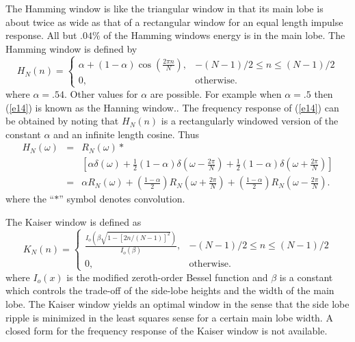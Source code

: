 	The Hamming window
 is like the triangular window
in that its main lobe is about twice as wide as that of
a rectangular window for an equal length impulse response.
All but $.04\%$ of the Hamming windows energy is in the
main lobe.  The Hamming window is defined by
%
\begin{equation}
H_N(n)=
        \left\{ \begin{array}{ll}
 \alpha+(1-\alpha)\cos(\frac{2\pi n}{N}), & \mbox{$-(N-1)/2\le n\le (N-1)/2$}\\
             0, & \mbox{otherwise}.
                \end{array}
       \right.
\label{e14}
\end{equation}
%
where $\alpha=.54$.  Other values for $\alpha$ are possible.
For example when $\alpha=.5$ then  (\ref{e14}) is known as the
Hanning window.. The frequency response of (\ref{e14})
can be obtained by noting that $H_N(n)$ is a
rectangularly windowed version of the constant $\alpha$ and an
infinite length cosine.  Thus
%
\begin{eqnarray}
H_N(\omega) &=&
R_N(\omega)*\\
&&[\alpha\delta(\omega)+\frac{1}{2}(1-\alpha)\delta(\omega
-\frac{2\pi}{N})+\frac{1}{2}(1-\alpha)\delta(\omega+\frac{2\pi}{N})]\\
&=& \alpha R_N(\omega)+(\frac{1-\alpha}{2})R_N(\omega+\frac{2\pi}{N})+
(\frac{1-\alpha}{2})R_N(\omega-\frac{2\pi}{N}).
\label{e15}
\end{eqnarray}
%
where the ``$*$'' symbol denotes convolution.

	The Kaiser window
 is defined as
%
\begin{equation}
K_N(n)=
        \left\{ \begin{array}{ll}
             \frac{I_o(\beta\sqrt{1-[2n/(N-1)]^2})}{I_o(\beta)},
                &  \mbox{$-(N-1)/2\le n\le(N-1)/2$}\\
             0, &  \mbox{otherwise}.
                \end{array}
       \right.
\label{e16}
\end{equation}
%
where $I_o(x)$ is the modified zeroth-order Bessel function and
$\beta$ is a constant which controls the trade-off of the side-lobe
heights and the width of the main lobe.  The Kaiser 
window yields an optimal window in the sense that
the side lobe ripple is minimized in the least squares
sense for a certain main lobe width.
A closed form for the frequency response of the Kaiser window
is not available.

